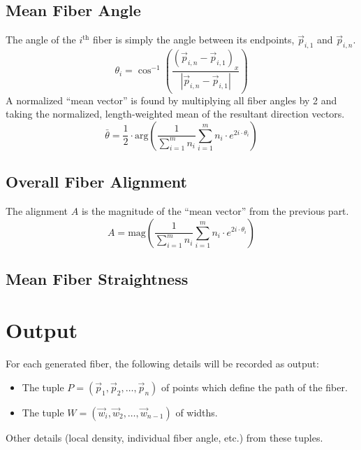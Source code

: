 \documentclass[12pt]{article}
\begin{document}
\subsection*{Mean Fiber Angle}

The angle of the $i^\text{th}$ fiber is simply the angle between its endpoints, $\vec{p}_{i,1}$ and $\vec{p}_{i,n}$.
\begin{equation*}
    \theta_i = \cos^{-1} \left(\frac{(\vec{p}_{i,n} - \vec{p}_{i,1})_x}{|\vec{p}_{i,n} - \vec{p}_{i,1}|}\right)
\end{equation*}
A normalized ``mean vector'' is found by multiplying all fiber angles by 2 and taking the normalized, length-weighted mean of the resultant direction vectors.
\begin{equation*}
    \bar{\theta} = \frac{1}{2} \cdot \text{arg} \left(
    \frac{1}{\sum_{i = 1}^m n_i} 
    \sum_{i = 1}^m n_i \cdot e^{2 i \cdot \theta_i} \right)
\end{equation*}


\subsection*{Overall Fiber Alignment}

The alignment $A$ is the magnitude of the ``mean vector'' from the previous part.
\begin{equation*}
    A = \text{mag} \left(
    \frac{1}{\sum_{i = 1}^m n_i} 
    \sum_{i = 1}^m n_i \cdot e^{2 i \cdot \theta_i} \right)
\end{equation*}


\subsection*{Mean Fiber Straightness}
    

\section*{Output}

For each generated fiber, the following details will be recorded as output:
\begin{itemize}
    \item The tuple $P = (\vec{p}_1, \vec{p}_2, \ldots, \vec{p}_n)$ of points which define the path of the fiber.
    \item The tuple $W = (\vec{w}_i, \vec{w}_2, \ldots, \vec{w}_{n - 1})$ of widths.
\end{itemize}
Other details (local density, individual fiber angle, etc.) from these tuples.
\end{document}
